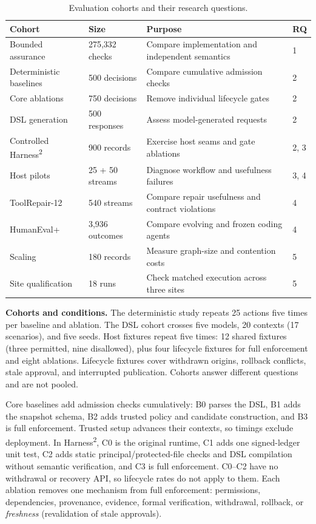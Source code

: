 \documentclass[letterpaper,journal]{IEEEtran}
\newcommand{\harness}{Harness\textsuperscript{2}}
\begin{document}
\begin{table}[t]\caption{Evaluation cohorts and their research questions.}\label{tab:design}\centering\footnotesize
\setlength{\tabcolsep}{5pt}
\begin{tabular}{L{0.25\textwidth}L{0.20\textwidth}L{0.39\textwidth}l}\toprule
Cohort & Size & Purpose & RQ\\\midrule
Bounded assurance & 275,332 checks & Compare implementation and independent semantics & 1\\
Deterministic baselines & 500 decisions & Compare cumulative admission checks & 2\\
Core ablations & 750 decisions & Remove individual lifecycle gates & 2\\
DSL generation & 500 responses & Assess model-generated requests & 2\\
Controlled \harness{} & 900 records & Exercise host seams and gate ablations & 2, 3\\
Host pilots & 25 + 50 streams & Diagnose workflow and usefulness failures & 3, 4\\
ToolRepair-12 & 540 streams & Compare repair usefulness and contract violations & 4\\
HumanEval+ & 3,936 outcomes & Compare evolving and frozen coding agents & 4\\
Scaling & 180 records & Measure graph-size and contention costs & 5\\
Site qualification & 18 runs & Check matched execution across three sites & 5\\\bottomrule
\end{tabular}\end{table}

\textbf{Cohorts and conditions.} The deterministic study repeats 25 actions five times per baseline and ablation. The DSL cohort crosses five models, 20 contexts (17 scenarios), and five seeds. Host fixtures repeat five times: 12 shared fixtures (three permitted, nine disallowed), plus four lifecycle fixtures for full enforcement and eight ablations. Lifecycle fixtures cover withdrawn origins, rollback conflicts, stale approval, and interrupted publication. Cohorts answer different questions and are not pooled.

Core baselines add admission checks cumulatively: B0 parses the DSL, B1 adds the snapshot schema, B2 adds trusted policy and candidate construction, and B3 is full enforcement. Trusted setup advances their contexts, so timings exclude deployment. In \harness{}, C0 is the original runtime, C1 adds one signed-ledger unit test, C2 adds static principal/protected-file checks and DSL compilation without semantic verification, and C3 is full enforcement. C0--C2 have no withdrawal or recovery API, so lifecycle rates do not apply to them. Each ablation removes one mechanism from full enforcement: permissions, dependencies, provenance, evidence, formal verification, withdrawal, rollback, or \emph{freshness} (revalidation of stale approvals).
\end{document}
